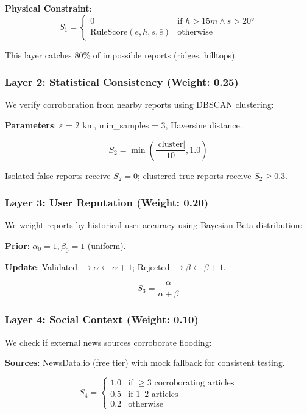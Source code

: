 \documentclass[conference]{IEEEtran}
\begin{document}
\textbf{Physical Constraint}:
\begin{equation}
S_1 = \begin{cases}
0 & \text{if } h > 15m \land s > 20° \\
\text{RuleScore}(e, h, s, \bar{e}) & \text{otherwise}
\end{cases}
\end{equation}

This layer catches 80\% of impossible reports (ridges, hilltops).

\subsubsection{Layer 2: Statistical Consistency (Weight: 0.25)}
We verify corroboration from nearby reports using DBSCAN clustering:

\textbf{Parameters}: $\varepsilon$ = 2 km, min\_samples = 3, Haversine distance.

\begin{equation}
S_2 = \min\left(\frac{|\text{cluster}|}{10}, 1.0\right)
\end{equation}

Isolated false reports receive $S_2 = 0$; clustered true reports receive $S_2 \geq 0.3$.

\subsubsection{Layer 3: User Reputation (Weight: 0.20)}
We weight reports by historical user accuracy using Bayesian Beta distribution:

\textbf{Prior}: $\alpha_0 = 1, \beta_0 = 1$ (uniform).

\textbf{Update}: Validated $\rightarrow \alpha \leftarrow \alpha + 1$; Rejected $\rightarrow \beta \leftarrow \beta + 1$.

\begin{equation}
S_3 = \frac{\alpha}{\alpha + \beta}
\end{equation}

\subsubsection{Layer 4: Social Context (Weight: 0.10)}
We check if external news sources corroborate flooding:

\textbf{Sources}: NewsData.io (free tier) with mock fallback for consistent testing.

\begin{equation}
S_4 = \begin{cases}
1.0 & \text{if } \geq 3 \text{ corroborating articles} \\
0.5 & \text{if } 1\text{--}2 \text{ articles} \\
0.2 & \text{otherwise}
\end{cases}
\end{equation}
\end{document}
